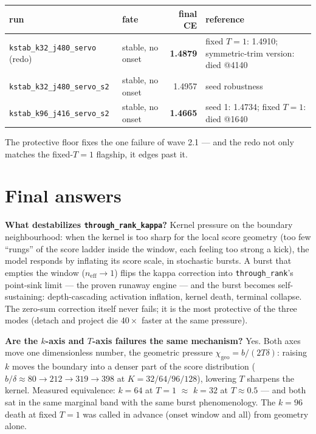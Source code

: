 \documentclass[11pt,a4paper]{article}
\newcommand{\code}[1]{\texttt{#1}}
\newcommand{\neff}{n_{\mathrm{eff}}}
\newcommand{\chigeo}{\chi_{\mathrm{geo}}}
\begin{document}
\begin{center}\small
\begin{tabular}{p{4.6cm}p{3.0cm}rp{4.2cm}}
\toprule
run & fate & final CE & reference \\
\midrule
\code{kstab\_k32\_j480\_servo} (redo) & stable, no onset & \textbf{1.4879}
& fixed $T{=}1$: 1.4910; symmetric-trim version: died @4140 \\
\code{kstab\_k32\_j480\_servo\_s2} & stable, no onset & 1.4957 & seed
robustness \\
\code{kstab\_k96\_j416\_servo\_s2} & stable, no onset & \textbf{1.4665} &
seed 1: 1.4734; fixed $T{=}1$: died @1640 \\
\bottomrule
\end{tabular}
\end{center}

The protective floor fixes the one failure of wave 2.1 --- and the redo not
only matches the fixed-$T{=}1$ flagship, it edges past it.

\section{Final answers}

\textbf{What destabilizes \code{through\_rank\_kappa}?} Kernel pressure on
the boundary neighbourhood: when the kernel is too sharp for the local score
geometry (too few ``rungs'' of the score ladder inside the window, each
feeling too strong a kick), the model responds by inflating its score scale,
in stochastic bursts. A burst that empties the window ($\neff \to 1$) flips
the kappa correction into \code{through\_rank}'s point-sink limit --- the
proven runaway engine --- and the burst becomes self-sustaining:
depth-cascading activation inflation, kernel death, terminal collapse. The
zero-sum correction itself never fails; it is the most protective of the
three modes (detach and project die $40\times$ faster at the same pressure).

\textbf{Are the $k$-axis and $T$-axis failures the same mechanism?} Yes.
Both axes move one dimensionless number, the geometric pressure
$\chigeo = b/(2T\delta)$: raising $k$ moves the boundary into a denser part
of the score distribution ($b/\delta \approx 80 \to 212 \to 319 \to 398$
at $K = 32/64/96/128$), lowering $T$ sharpens the kernel. Measured
equivalence: $k{=}64$ at $T{=}1$ $\approx$ $k{=}32$ at $T{\approx}0.5$ ---
and both sat in the same marginal band with the same burst phenomenology.
The $k{=}96$ death at fixed $T{=}1$ was called in advance (onset window and
all) from geometry alone.
\end{document}
